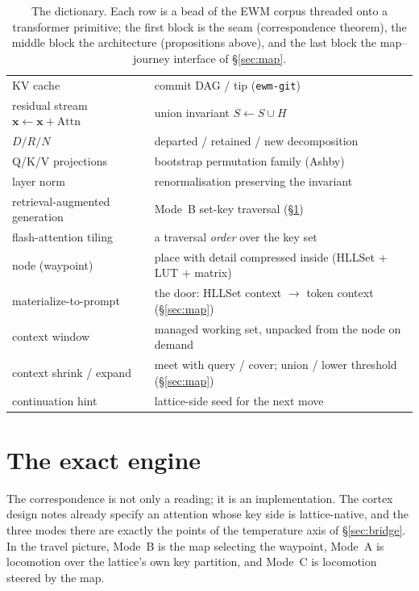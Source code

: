 \documentclass[11pt,a4paper]{article}
\theoremstyle{remark}
\newcommand{\HLL}{\ensuremath{H}}                      %
\newcommand{\Attn}{\ensuremath{\mathrm{Attn}}}          %
\newcommand{\xx}{\ensuremath{\mathbf{x}}}               %
\begin{document}
\begin{table}[!ht]
\begin{tabular}{@{}p{}p{}@{}}
KV cache & commit DAG / tip (\texttt{ewm-git}) \\
residual stream $\xx\!\leftarrow\!\xx+\Attn$ & union invariant $S\!\leftarrow\!S\cup\HLL$ \\
$D/R/N$ & departed / retained / new decomposition \\
Q/K/V projections & bootstrap permutation family (Ashby) \\
layer norm & renormalisation preserving the invariant \\
retrieval-augmented generation & Mode~B set-key traversal (\S\ref{sec:engine}) \\
flash-attention tiling & a traversal \emph{order} over the key set \\
\midrule
node (waypoint) & place with detail compressed inside (HLLSet + LUT + matrix) \\
materialize-to-prompt & the door: HLLSet context $\to$ token context (\S\ref{sec:map}) \\
context window & managed working set, unpacked from the node on demand \\
context shrink / expand & meet with query / cover; union / lower threshold (\S\ref{sec:map}) \\
continuation hint & lattice-side seed for the next move \cite{ctx2026} \\
\bottomrule
\end{tabular}
\caption{The dictionary. Each row is a bead of the EWM corpus threaded onto a
transformer primitive; the first block is the seam (correspondence theorem), the
middle block the architecture (propositions above), and the last block the
map--journey interface of \S\ref{sec:map}.}
\label{tab:dictionary}
\end{table}

\FloatBarrier

\section{The exact engine}
\label{sec:engine}

The correspondence is not only a reading; it is an implementation. The cortex
design notes \cite{kspace2026,luttransformer2026} already specify an attention
whose key side is lattice-native, and the three modes there are exactly the
points of the temperature axis of \S\ref{sec:bridge}. In the travel picture,
Mode~B is the map selecting the waypoint, Mode~A is locomotion over the
lattice's own key partition, and Mode~C is locomotion steered by the map.
\end{document}
